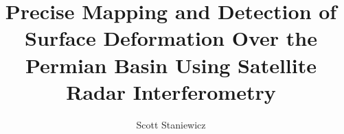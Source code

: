 \documentclass{utexasthesis}
\title{Precise Mapping and Detection of Surface Deformation Over the Permian Basin Using Satellite Radar Interferometry }
\author{Scott Staniewicz}
\begin{document}
\maketitle

\begin{dedication}


\end{dedication}


\begin{acknowledgments}

\end{acknowledgments}

\begin{abstract}
\end{abstract}

\maketableofcontents

















\pagebreak



\appendix




%

% 


\makeappendix

%
%
 
\end{document}

